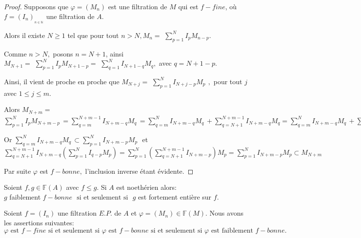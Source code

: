 \begin{proof}
	Supposons que $\varphi =(M_{n})$ est une filtration de $M$ qui est $f-fine$,
	où $f=(I_{n})_{_{n\in \mathbb{N}}}$ une filtration de $A.$
	
	Alors il existe $N\geq 1$ tel que pour tout $n>N,M_{n}=$ $
	\sum\limits_{p=1}^{N}I_{p}M_{n-p}.$
	
	Comme $n>N,$ posons $n=N+1$, ainsi\\
	
	$M_{N+1}=$ $\sum\limits_{p=1}^{N}I_{p}M_{N+1-p}=$ $\sum\limits_{q=1}^{N}I_{N+1-q}M_{q},$ avec $q=N+1-p.$
	
	Ainsi, il vient de proche en proche que $M_{N+j}=$  $\sum\limits_{p=1}^{N}I_{N+j-p}M_{p}\,\ ,$ pour tout $j$ avec $1\leq j\leq m.$
	
	Alors $M_{N+m}=$ $\sum\limits_{p=1}^{N}I_{p}M_{N+m-p}\,=\sum\limits_{q=m}^{N+m-1}I_{N+m-q}M_{q}\,=\sum\limits_{q=m}^{N}I_{N+m-q}M_{q}\,+\sum\limits_{q=N+1}^{N+m-1}I_{N+m-q}M_{q}=\sum\limits_{q=m}^{N}I_{N+m-q}M_{q}\,+\sum\limits_{q=N+1}^{N+m-1}I_{N+m-q}(\sum\limits_{p=1}^{N}I_{q-p}M_{p}).$
	
	Or $\sum\limits_{q=m}^{N}I_{N+m-q}M_{q}\,\subset
	\sum\limits_{p=1}^{N}I_{N+m-p}M_{p}\,$\ et $\sum\limits_{q=N+1}^{N+m-1}I_{N+m-q}(\sum\limits_{p=1}^{N}I_{q-p}M_{p})=\sum\limits_{p=1}^{N}(\sum\limits_{q=N+1}^{N+m-1}I_{N+m-p})M_{p}=\sum\limits_{p=1}^{N}I_{N+m-p}M_{p}\subset M_{N+m}$
	
	Par suite $\varphi $ est $f-bonne,$ l'inclusion inverse étant évidente.
\end{proof}
\begin{moncorollaire}
	\label{maprop8}
	Soient $f,g \in \mathbb{F}(A)$ avec $f \leqslant g$. Si $A$ est noethérien alors:\\ 
	$g$ faiblement $f-bonne$ $\text{ si et seulement si }$ $g$ est fortement entière sur $f$.
\end{moncorollaire}
\begin{maproposition}
	Soient $f=(I_n)$ une filtration $E.P.$ de $A$ et $\varphi=(M_n) \in \mathbb{F}(M)$. Nous avons les assertions suivantes:
	\[ \varphi \text{ est } f-fine \text{ si et seulement si } \varphi \text{ est } f-bonne \text{ si et seulement si } \varphi \text{ est faiblement } f-bonne. \]
\end{maproposition}

